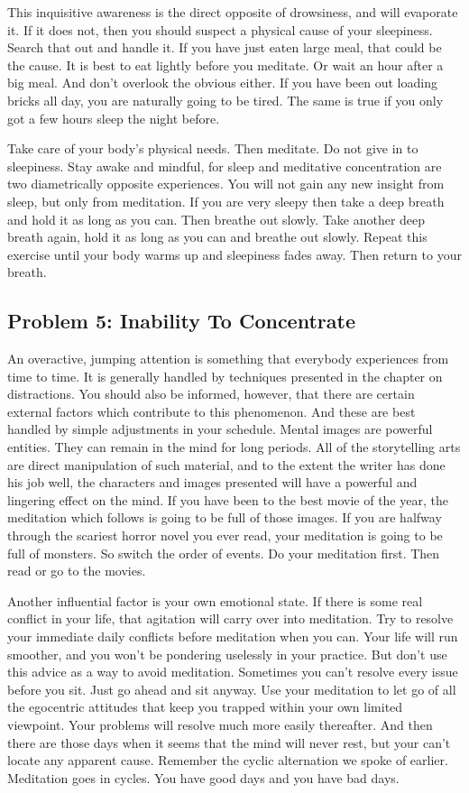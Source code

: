 This inquisitive awareness is the direct opposite of drowsiness, and will
evaporate it. If it does not, then you should suspect a physical cause of your
sleepiness. Search that out and handle it. If you have just eaten large meal,
that could be the cause. It is best to eat lightly before you meditate. Or wait
an hour after a big meal. And don't overlook the obvious either. If you have
been out loading bricks all day, you are naturally going to be tired. The same
is true if you only got a few hours sleep the night before.

Take care of your body's physical needs. Then meditate. Do not give in to
sleepiness. Stay awake and mindful, for sleep and meditative concentration are
two diametrically opposite experiences. You will not gain any new insight from
sleep, but only from meditation. If you are very sleepy then take a deep breath
and hold it as long as you can. Then breathe out slowly. Take another deep
breath again, hold it as long as you can and breathe out slowly. Repeat this
exercise until your body warms up and sleepiness fades away. Then return to your
breath.

\subsection*{Problem 5: Inability To Concentrate} 
An overactive, jumping attention is something
that everybody experiences from time to time. It is generally handled by
techniques presented in the chapter on distractions. You should also be
informed, however, that there are certain external factors which contribute to
this phenomenon. And these are best handled by simple adjustments in your
schedule. Mental images are powerful entities. They can remain in the mind for
long periods. All of the storytelling arts are direct manipulation of such
material, and to the extent the writer has done his job well, the characters and
images presented will have a powerful and lingering effect on the mind. If you
have been to the best movie of the year, the meditation which follows is going
to be full of those images. If you are halfway through the scariest horror novel
you ever read, your meditation is going to be full of monsters. So switch the
order of events. Do your meditation first. Then read or go to the movies.

Another influential factor is your own emotional state. If there is some real
conflict in your life, that agitation will carry over into meditation. Try to
resolve your immediate daily conflicts before meditation when you can. Your life
will run smoother, and you won't be pondering uselessly in your practice. But
don't use this advice as a way to avoid meditation. Sometimes you can't resolve
every issue before you sit. Just go ahead and sit anyway. Use your meditation to
let go of all the egocentric attitudes that keep you trapped within your own
limited viewpoint. Your problems will resolve much more easily thereafter. And
then there are those days when it seems that the mind will never rest, but your
can't locate any apparent cause. Remember the cyclic alternation we spoke of
earlier. Meditation goes in cycles. You have good days and you have bad days.

